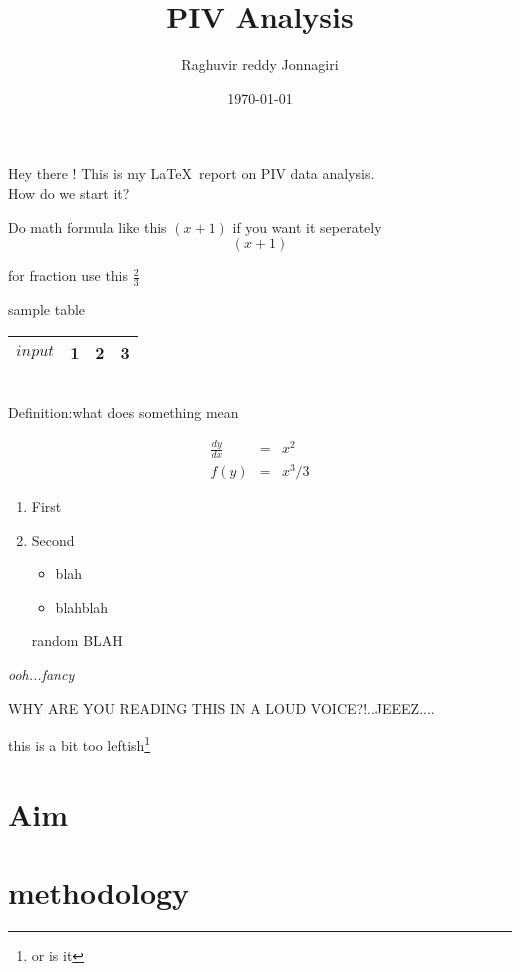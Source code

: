\documentclass[11pt]{report}
\def\Definition{what does something mean}
\begin{document}
\title{PIV Analysis}
\author{Raghuvir reddy Jonnagiri}
\date{\today}
\maketitle
\thispagestyle{empty}
\clearpage

\tableofcontents
\thispagestyle{empty}
\clearpage

Hey there \hypertarget{label1}{!}
This is my \LaTeX \  report on PIV data analysis.\\
How do we start it?

Do math formula like this $(x+1)$
if you want it seperately $$(x+1)$$

for fraction use this $\displaystyle{\frac{2}{3}}$

sample table 
\begin{tabular}{|c|c|c|c|}
\hline
$input$ & 1 & 2 & 3 \\
\hline
\end{tabular} \\

Definition:\Definition

\begin{eqnarray*}
\frac{dy}{dx}&=&x^2 \\
f(y)&=&x^3/3
\end{eqnarray*}

\begin{enumerate}
\item First
\item Second
	\begin{itemize}
	\item blah
	\item blahblah
	\end{itemize}
\item[random] BLAH
\end{enumerate}

\textit{ooh...fancy}

\begin{Large}WHY ARE YOU READING THIS IN A LOUD VOICE?!..JEEEZ....\end{Large}

\begin{flushleft}
this is a bit too leftish\footnote{or is it}
\end{flushleft}
\clearpage
\setcounter{page}{1}

\section{Aim}
\section{methodology}
\end{document}
